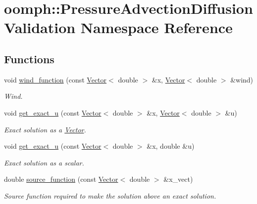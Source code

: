 \hypertarget{namespaceoomph_1_1PressureAdvectionDiffusionValidation}{}\section{oomph\+:\+:Pressure\+Advection\+Diffusion\+Validation Namespace Reference}
\label{namespaceoomph_1_1PressureAdvectionDiffusionValidation}
\subsection*{Functions}
\begin{DoxyCompactItemize}
\item 
void \hyperlink{namespaceoomph_1_1PressureAdvectionDiffusionValidation_a7bb38b47b4d4efe2e775baf918dda476}{wind\+\_\+function} (const \hyperlink{classoomph_1_1Vector}{Vector}$<$ double $>$ \&x, \hyperlink{classoomph_1_1Vector}{Vector}$<$ double $>$ \&wind)
\begin{DoxyCompactList}\small\item\em Wind. \end{DoxyCompactList}\item 
void \hyperlink{namespaceoomph_1_1PressureAdvectionDiffusionValidation_a4f01cf3a330e714439119ccd6e79f11e}{get\+\_\+exact\+\_\+u} (const \hyperlink{classoomph_1_1Vector}{Vector}$<$ double $>$ \&x, \hyperlink{classoomph_1_1Vector}{Vector}$<$ double $>$ \&u)
\begin{DoxyCompactList}\small\item\em Exact solution as a \hyperlink{classoomph_1_1Vector}{Vector}. \end{DoxyCompactList}\item 
void \hyperlink{namespaceoomph_1_1PressureAdvectionDiffusionValidation_a5edd580baaf74648e888f4deff481218}{get\+\_\+exact\+\_\+u} (const \hyperlink{classoomph_1_1Vector}{Vector}$<$ double $>$ \&x, double \&u)
\begin{DoxyCompactList}\small\item\em Exact solution as a scalar. \end{DoxyCompactList}\item 
double \hyperlink{namespaceoomph_1_1PressureAdvectionDiffusionValidation_a704323835d1c48a60a83670d8694c938}{source\+\_\+function} (const \hyperlink{classoomph_1_1Vector}{Vector}$<$ double $>$ \&x\+\_\+vect)
\begin{DoxyCompactList}\small\item\em Source function required to make the solution above an exact solution. \end{DoxyCompactList}\end{DoxyCompactItemize}
